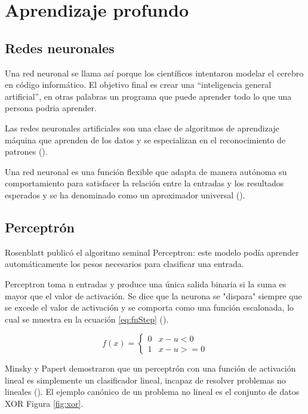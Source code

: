\section{Aprendizaje profundo}

\subsection{Redes neuronales}

Una red neuronal se llama así porque los científicos intentaron modelar el cerebro en código informático. El objetivo final es crear una “inteligencia general artificial”, en otras palabras un programa que puede aprender todo lo que una persona podria aprender.

Las redes neuronales artificiales son una clase de algoritmos de aprendizaje máquina que aprenden de los datos y se especializan en el reconocimiento de patrones (\cite{rosebrock2017deep}).

Una red neuronal es una función flexible que adapta de manera autónoma su comportamiento para satisfacer la relación entre la entradas y los resultados esperados y se ha denominado como un aproximador universal (\cite{goyal2018Deep}).

\subsection{Perceptrón}

Rosenblatt publicó el algoritmo seminal Perceptron: este modelo podía aprender automáticamente los pesos necesarios para clasificar una entrada.

Perceptron toma n entradas y produce una única salida binaria si la suma es mayor que el valor de activación. Se dice que la neurona se "dispara" siempre que se excede el valor de activación y se comporta como una función escalonada, lo cual se muestra en la ecuación \ref{eq:fnStep} (\cite{goyal2018Deep}).

\begin{equation}
\label{eq:fnStep}
    f\left(x\right)=\begin{cases}0 & x -u < 0\\1 & x -u >= 0\end{cases}
\end{equation}



Minsky y Papert demostraron que un perceptrón con una función de activación lineal es simplemente un clasificador lineal, incapaz de resolver problemas no lineales (\cite{rosebrock2017deep}). El ejemplo canónico de un problema no lineal es el conjunto de datos XOR Figura \ref{fig:xor}.


